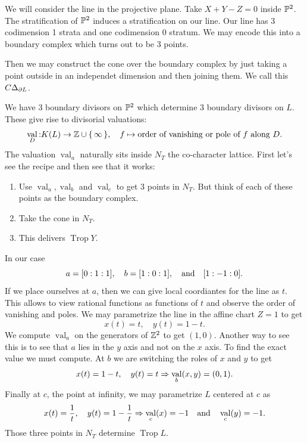 \documentclass[12pt]{memoir}
\DeclareMathOperator{\val}{val}
\DeclareMathOperator{\Trop}{Trop}
\begin{document}
\begin{Ex}
    We will consider the line in the projective plane. Take $X+Y-Z=0$ inside $\mathbb{P}^2$. The stratification of $\mathbb{P}^2$ induces a stratification on our line. Our line has 3 codimension 1 strata and one codimension 0 stratum. We may encode this into a boundary complex which turns out to be 3 points.\par 
    Then we may construct the cone over the boundary complex by just taking a point outside in an independet dimension and then joining them. We call this $C\Delta_{\partial L}$.\par 
    We have 3 boundary divisors on $\mathbb{P}^2$ which determine 3 boundary divisors on $L$. These give rise to divisorial valuations:
    $$\val_D\: K(L)\to\bZ\cup\set{\infty},\quad f\mapsto\text{order of vanishing or pole of }f\text{ along }D.$$
     The valuation $\val_a$ naturally sits inside $N_T$ the co-character lattice. First let's see the recipe and then see that it works:
    \begin{enumerate}
        \item Use $\val_a,\val_b$ and $\val_c$ to get $3$ points in $N_T$. But think of each of these points as the boundary complex.
        \item Take the cone in $N_T$.
        \item This delivers $\Trop Y$. 
    \end{enumerate}
    In our case 
    $$a=[0:1:1],\quad b=[1:0:1],\quad\text{and}\quad[1:-1:0].$$
    If we place ourselves at $a$, then we can give local coordiantes for the line as $t$. This allows to view rational functions as functions of $t$ and observe the order of vanishing and poles. We may parametrize the line in the affine chart $Z=1$ to get
    $$x(t)=t,\quad y(t)=1-t.$$
    We compute $\val_a$ on the generators of $\mathbb{Z}^2$ to get $(1,0)$. Another way to see this is to see that $a$ lies in the $y$ axis and not on the $x$ axis. To find the exact value we must compute. At $b$ we are switching the roles of $x$ and $y$ to get 
    $$x(t)=1-t,\quad y(t)=t\To \val_b(x,y)=(0,1).$$
    Finally at $c$, the point at infinity, we may parametrize $L$ centered at $c$ as 
    $$x(t)=\frac{1}{t},\quad y(t)=1-\frac1t\To\val_c(x)=-1\word{and}\val_c(y)=-1.$$
    Those three points in $N_T$ determine $\Trop L$. 
\end{Ex}
\end{document}
